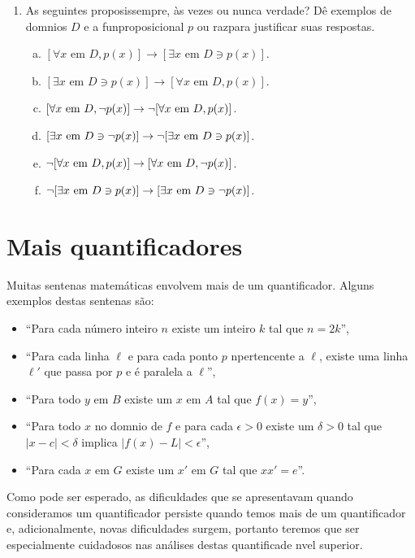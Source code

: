 \begin{enumerate}[{\bf 1.}]
\item As seguintes proposi\coes s\ao sempre, \`as vezes ou nunca verdade? D\^e exemplos de dom\ih nios $D$ e a fun\cao proposicional $p$ ou raz\oes para justificar suas respostas. 
\begin{enumerate}[a)]
\item $[\forall x \textrm{ em } D, p(x)]\to[\exists x \textrm{ em } D \ni p(x)]$.
\item $[\exists x \textrm{ em } D \ni p(x)]\to[\forall x \textrm{ em } D, p(x)]$.
\item $[\forall x \textrm{ em } D, \lnot p(x)]\to\lnot[\forall x \textrm{ em } D, p(x)]$.
\item $[\exists x \textrm{ em } D \ni \lnot p(x)]\to \lnot[\exists x \textrm{ em } D \ni p(x)]$.
\item $\lnot[\forall x \textrm{ em } D, p(x)]\to[\forall x \textrm{ em } D, \lnot p(x)]$.
\item $\lnot[\exists x \textrm{ em } D \ni p(x)]\to[\exists x \textrm{ em } D \ni \lnot p(x)]$.
\end{enumerate}
\end{enumerate}

\section{Mais quantificadores}\label{mquantificadores}

Muitas senten\cc as matem\'aticas envolvem mais de um quantificador. Alguns exemplos destas senten\cc as são:
\begin{itemize}
 	\item  ``Para cada n\'umero inteiro $n$ existe um inteiro $k$ tal que $n=2k$'', 
 	\item ``Para cada linha $\ell$ e para cada ponto $p$ n\ao pertencente a $\ell$, existe uma linha $\ell'$ que passa por $p$ e \'e paralela a $\ell$'', 
 	\item ``Para todo $y$ em $B$ existe um $x$ em $A$ tal que $f(x)=y$'', 
 	\item ``Para todo $x$ no dom\ih nio de $f$  e para cada $\epsilon >0$ existe um $\delta >0$ tal que $|x-c|<\delta$ implica $|f(x)-L|<\epsilon$'', 
 	\item ``Para cada $x$ em $G$ existe um $x'$ em $G$ tal que $xx'=e$''. 
 \end{itemize}

 Como pode ser esperado, as dificuldades que se apresentavam quando consideramos um quantificador persiste quando temos mais de um quantificador e, adicionalmente, novas dificuldades surgem, portanto teremos que ser especialmente cuidadosos nas an\'alises destas quantifica\coes de n\ih vel superior.


